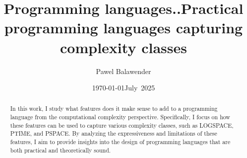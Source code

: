 \documentclass[en]  {pracamgr}
\title{Programming languages..}
\author{Pawel Balawender}
\date{\today}
\title{Practical programming languages capturing complexity classes}
\date{July~2025}
\theoremstyle{plain}
\theoremstyle{definition}
\theoremstyle{definition}
\theoremstyle{plain}
\theoremstyle{remark}
\theoremstyle{remark}
\begin{document}
\hypersetup{pageanchor=false}
\maketitle

\begin{abstract}
    In this work, I study what features does it make sense to add to a programming language
    from the computational complexity perspective. Specifically, I focus on how these features can be used to capture various complexity classes, such as LOGSPACE, PTIME, and PSPACE. By analyzing the expressiveness and limitations of these features, I aim to provide insights into the design of programming languages that are both practical and theoretically sound.
\end{abstract}

\hypersetup{pageanchor=true}
\tableofcontents



\printbibliography[heading=bibintoc]

\end{document}
